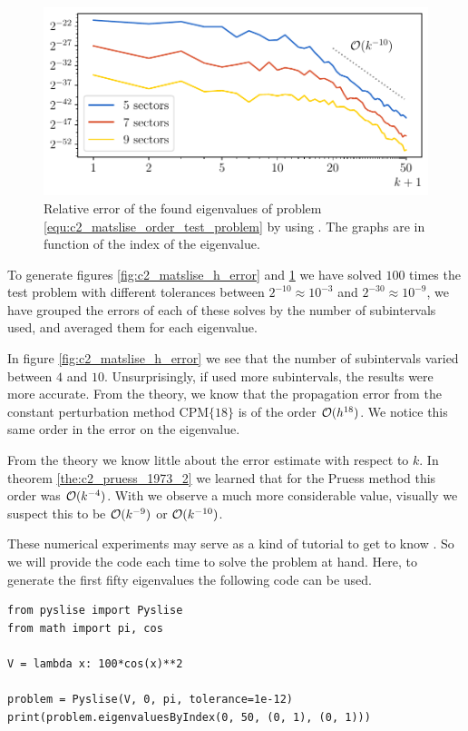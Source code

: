 \begin{figure}
    \begin{center}
        \includegraphics[width=\textwidth]{img/chapter2/matslise_k_error.pdf}
    \end{center}
    \caption{Relative error of the found eigenvalues of problem \eqref{equ:c2_matslise_order_test_problem} by using . The graphs are in function of the index of the eigenvalue.}
    \label{fig:c2_matslise_k_error}
\end{figure}

To generate figures \ref{fig:c2_matslise_h_error} and \ref{fig:c2_matslise_k_error} we have solved $100$ times the test problem with different tolerances between $2^{-10} \approx 10^{-3}$ and $2^{-30} \approx 10^{-9}$, we have grouped the errors of each of these solves by the number of subintervals  used, and averaged them for each eigenvalue.

In figure \ref{fig:c2_matslise_h_error} we see that the number of subintervals varied between $4$ and $10$. Unsurprisingly, if \matslise{} used more subintervals, the results were more accurate. From the theory, we know that the propagation error from the constant perturbation method $\text{CPM}\{18\}$ is of the order $\operatorname{\mathcal{O}}(h^{18})$. We notice this same order in the error on the eigenvalue.

From the theory we know little about the error estimate with respect to $k$. In theorem \ref{the:c2_pruess_1973_2} we learned that for the Pruess method this order was $\operatorname{\mathcal{O}}(k^{-4})$. With \matslise{} we observe a much more considerable value, visually we suspect this to be $\operatorname{\mathcal{O}}(k^{-9})$ or $\operatorname{\mathcal{O}}(k^{-10})$.

These numerical experiments may serve as a kind of tutorial to get to know \pyslise{}. So we will provide the code each time to solve the problem at hand. Here, to generate the first fifty eigenvalues the following code can be used.
\begin{verbatim}
from pyslise import Pyslise
from math import pi, cos

V = lambda x: 100*cos(x)**2

problem = Pyslise(V, 0, pi, tolerance=1e-12)
print(problem.eigenvaluesByIndex(0, 50, (0, 1), (0, 1)))
\end{verbatim}


